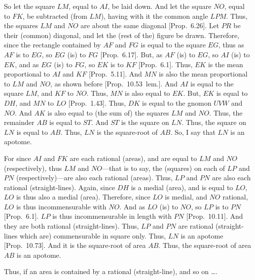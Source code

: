 \begin{Parallel}{}{}
{So let the square $LM$, equal to $AI$, be laid down. And let the square $NO$,
equal to $FK$, be
subtracted (from $LM$), having with it the common angle $LPM$. Thus,
the squares $LM$ and $NO$ are about the same diagonal [Prop.~6.26]. Let $PR$ be their (common) diagonal, and
let the (rest of the) figure be drawn. Therefore, since
the rectangle contained by $AF$ and $FG$ is equal to the square $EG$,
thus as $AF$ is to $EG$, so $EG$ (is) to $FG$ [Prop.~6.17]. But, as $AF$ (is) to $EG$, so $AI$ (is)
to $EK$, and as $EG$ (is) to $FG$, so $EK$ is to $KF$ [Prop.~6.1]. Thus, $EK$ is the mean proportional
to $AI$ and $KF$ [Prop.~5.11]. And $MN$ is also the mean proportional to
$LM$ and $NO$, as shown before [Prop.~10.53~lem.].  And $AI$ is equal to the
square $LM$, and $KF$ to $NO$. Thus, $MN$ is also equal to $EK$.
But, $EK$ is equal to $DH$, and $MN$ to $LO$ [Prop.~1.43]. Thus, $DK$ is equal to the
gnomon $UVW$ and  $NO$. And $AK$ is also equal to 
(the sum of) the squares $LM$ and $NO$.  Thus, the remainder $AB$ is equal
to $ST$. And $ST$ is the square on $LN$. Thus, the square on $LN$
is equal to $AB$. Thus, $LN$ is the square-root of $AB$. So, I say that
$LN$ is an apotome.

For since $AI$ and $FK$ are each rational (areas), and are equal to
$LM$ and $NO$ (respectively), thus  $LM$ and $NO$---that is to say, the
(squares) on each of $LP$ and $PN$ (respectively)---are  also
each rational (areas). Thus, $LP$ and $PN$ are also each rational (straight-lines). 
Again, since $DH$ is a medial (area), and is equal to $LO$, $LO$ is thus
also a medial (area). Therefore, since $LO$ is medial, and $NO$ rational, 
$LO$ is thus incommensurable with $NO$. And as $LO$ (is) to $NO$,
so $LP$ is to $PN$ [Prop.~6.1]. $LP$ is
thus incommensurable in length with $PN$ [Prop.~10.11]. And they are both rational
(straight-lines). Thus, $LP$ and $PN$ are rational (straight-lines which are)
commensurable in square only. Thus, $LN$ is an apotome [Prop.~10.73]. And it is the square-root of area $AB$. Thus, the square-root of area $AB$ is an apotome.

Thus, if an area is contained by a rational (straight-line), and
so on \ldots.}
\end{Parallel}

